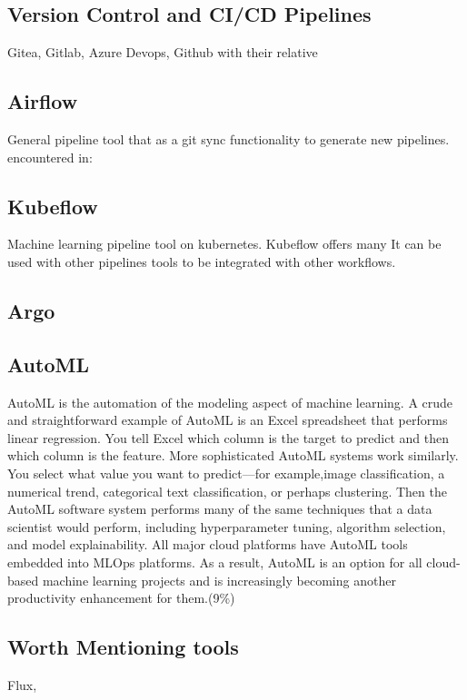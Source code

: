 \subsection{Version Control and CI/CD Pipelines}
Gitea, Gitlab, Azure Devops, Github with their relative
\subsection{Airflow}
General pipeline tool that as a git sync functionality to generate new pipelines.
encountered in:
\subsection{Kubeflow}
Machine learning pipeline tool on kubernetes.
Kubeflow offers many
It can be used with other pipelines tools to be integrated with other workflows.

\subsection{Argo}
\subsection{AutoML}

AutoML is the automation of the modeling aspect of machine learning.
A crude and straightforward example of AutoML is an Excel spreadsheet that performs linear regression.
You tell Excel which column is the target to predict and then which column is the feature.
More sophisticated AutoML systems work similarly.
You select what value you want to predict—for example,image classification, a numerical trend,
categorical text classification, or perhaps clustering.
Then the AutoML software system performs many of the same techniques that a data scientist would perform,
including hyperparameter tuning, algorithm selection, and model explainability.
All major cloud platforms have AutoML tools embedded into MLOps platforms.
As a result, AutoML is an option for all cloud-based machine learning projects and is increasingly becoming another productivity enhancement for them.\cite{gift2021practical}(9\%)

\subsection{Worth Mentioning tools}
Flux,